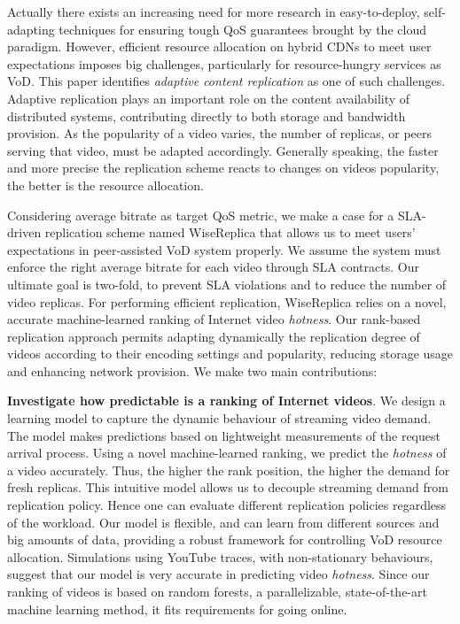 Actually there exists an increasing need for more research in easy-to-deploy, self-adapting techniques for ensuring tough QoS guarantees brought by the cloud paradigm. However, efficient resource allocation on hybrid CDNs to meet user expectations imposes big challenges, particularly for resource-hungry services as VoD. 
This paper identifies \emph{adaptive content replication} as one of such challenges. Adaptive replication plays an important role on the content availability of distributed systems, contributing directly to both storage and bandwidth provision. As the popularity of a video varies, the number of replicas, or peers serving that video, must be adapted accordingly. Generally speaking, the faster and more precise the replication scheme reacts to changes on videos popularity, the better is the resource allocation. 

Considering average bitrate as target QoS metric, we make a case for a SLA-driven replication scheme named WiseReplica that allows us to meet users' expectations in peer-assisted VoD system properly. We assume the system must enforce the right average bitrate for each video through SLA contracts. Our ultimate goal is two-fold, to prevent SLA violations and to reduce the number of video replicas. For performing efficient replication, WiseReplica relies on a novel, accurate machine-learned ranking of Internet video \emph{hotness}. Our rank-based replication approach permits adapting dynamically the replication degree of videos according to their encoding settings and popularity, reducing storage usage and enhancing network provision.  We make two main contributions:

\noindent
\textbf{Investigate how predictable is a ranking of Internet videos}. We design a learning model to capture the dynamic behaviour of streaming video demand. The model makes predictions based on lightweight measurements of the request arrival process. Using a novel machine-learned ranking, we predict the \emph{hotness} of a video accurately. Thus, the higher the rank position, the higher the demand for fresh replicas. This intuitive model allows us to decouple streaming demand from replication policy. Hence one can evaluate different replication policies regardless of the workload. Our model is flexible, and can learn from different sources and big amounts of data, providing a robust framework for controlling VoD resource allocation. Simulations using YouTube traces, with non-stationary behaviours, suggest that our model is very accurate in predicting video \emph{hotness}. Since our ranking of videos is based on random forests, a parallelizable, state-of-the-art machine learning method, it fits requirements for going online.

